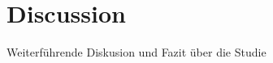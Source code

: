 
\chapter{Discussion} %

\label{Discussion} %
\begin{text}
Weiterführende Diskusion und Fazit über die Studie
\end{text}